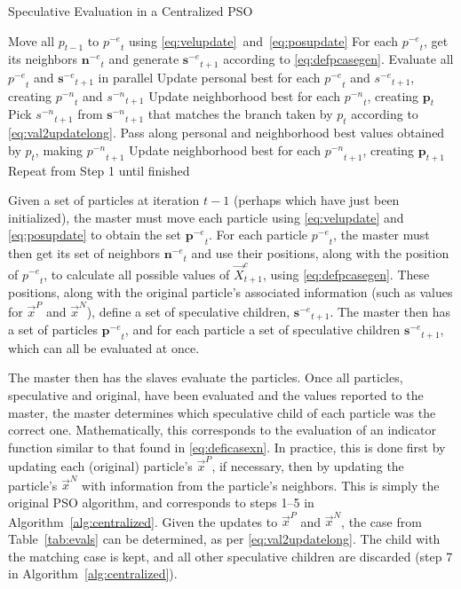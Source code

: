 \documentclass[smallcondensed]{svjour3}
\newcommand{\alg}[1]{Algorithm~\ref{alg:#1}}
\providecommand{\pers}{\ensuremath{P}}
\providecommand{\neigh}{\ensuremath{N}}
\providecommand{\nbest}{\ensuremath{\Vec{x}^\neigh}}
\providecommand{\pbest}{\ensuremath{\Vec{x}^\pers}}
\providecommand{\specpos}{\ensuremath{\vec{X}}}
\providecommand{\casegen}{\ensuremath{c}}
\providecommand{\noeval}[1]{\ensuremath{#1^{-e}}}
\providecommand{\nonbest}[1]{\ensuremath{#1^{-n}}}
\providecommand{\p}{\ensuremath{p}}
\providecommand{\pset}{\ensuremath{\mathbf{p}}}
\providecommand{\s}{\ensuremath{s}}
\providecommand{\sset}{\ensuremath{\mathbf{s}}}
\providecommand{\nset}{\ensuremath{\mathbf{n}}}
\begin{document}
\begin{algorithm}
  \caption{Speculative Evaluation in a Centralized PSO}
  \label{alg:centralized}
  \begin{algorithmic}[1]
	\STATE Move all $\p_{t-1}$ to $\noeval{\p}_t$ using
	  \eqref{eq:velupdate}~and~\eqref{eq:posupdate}
	\STATE For each $\noeval{\p}_t$, get its neighbors $\noeval{\nset}_t$ and
	  generate $\noeval{\sset}_{t+1}$ according to
	  \eqref{eq:defpcasegen}.
	\STATE Evaluate all $\noeval{\p}_t$ and $\noeval{\sset}_{t+1}$ in parallel
	\STATE Update personal best for each $\noeval{\p}_t$ and
	  $\noeval{\s}_{t+1}$, creating $\nonbest{\p}_t$ and $\nonbest{\s}_{t+1}$
	\STATE Update neighborhood best for each $\nonbest{\p}_t$, creating
	  $\pset_t$
	\FORALL{$\p_t$}
	\STATE Pick $\nonbest{\s}_{t+1}$ from $\nonbest{\sset}_{t+1}$ that matches
	  the branch taken by $\p_t$ according to
	  \eqref{eq:val2updatelong}.
	\STATE Pass along personal and neighborhood best values obtained by $\p_t$,
	  making $\nonbest{\p}_{t+1}$
	\ENDFOR
	\STATE Update neighborhood best for each $\nonbest{\p}_{t+1}$, creating
	  $\pset_{t+1}$
	\STATE Repeat from Step 1 until finished
  \end{algorithmic}
\end{algorithm}

Given a set of particles at iteration $t-1$ (perhaps which have just been
initialized), the master must move each particle using \eqref{eq:velupdate} and
\eqref{eq:posupdate} to obtain the set $\noeval{\pset}_t$.  For each particle
$\noeval{\p}_t$, the master must then get its set of neighbors
$\noeval{\nset}_t$ and use their positions, along with the position of
$\noeval{\p}_t$, to calculate all possible values of
$\specpos_{t+1}^{\casegen}$, using \eqref{eq:defpcasegen}.  These positions,
along with the original particle's associated information (such as values for
$\pbest$ and $\nbest$), define a set of speculative children,
$\noeval{\sset}_{t+1}$.  The master then has a set of particles
$\noeval{\pset}_t$, and for each particle a set of speculative children
$\noeval{\sset}_{t+1}$, which can all be evaluated at once.

The master then has the slaves evaluate the particles.  Once all particles,
speculative and original, have been evaluated and the values reported to the
master, the master determines which speculative child of each particle was the
correct one.  Mathematically, this corresponds to the evaluation of an
indicator function similar to that found in \eqref{eq:deficasexn}.  In
practice, this is done first by updating each (original) particle's $\pbest$,
if necessary, then by updating the particle's $\nbest$ with information from
the particle's neighbors.  This is simply the original PSO algorithm, and
corresponds to steps 1--5 in \alg{centralized}.  Given the updates to $\pbest$
and $\nbest$, the case from Table~\ref{tab:evals} can be determined, as per
\eqref{eq:val2updatelong}.  The child with the matching case is kept, and all
other speculative children are discarded (step 7 in \alg{centralized}).
\end{document}
